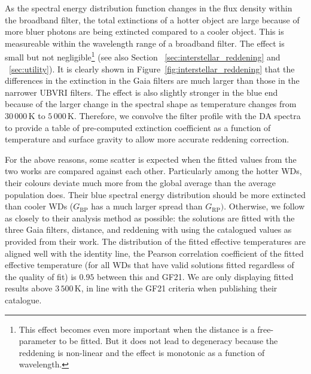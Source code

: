 \documentclass[fleqn,usenatbib]{rasti}
\begin{document}
As the spectral energy distribution function changes in the flux density
within the broadband filter, the total extinctions of a hotter object are
large because of more bluer photons are being extincted compared to a cooler
object. This is measureable within the wavelength range of a broadband filter.
The effect is small but not negligible\footnote{This effect
becomes even more important when the distance is a free-parameter to be fitted.
But it does not lead to degeneracy because the reddening is non-linear and
the effect is monotonic as a function of wavelength.} (see also Section
\textsection~\ref{sec:interstellar_reddening} and \textsection~\ref{sec:utility}).
It is clearly shown in Figure~\ref{fig:interstellar_reddening} that the
differences in the extinction in the Gaia filters are much larger than
those in the narrower UBVRI filters. The effect is also slightly
stronger in the blue end because of the larger change in the spectral
shape as temperature changes from $30\,000$\,K to $5\,000$\,K. Therefore, we
convolve the filter profile with the DA spectra to provide a table of
pre-computed extinction coefficient as a function of temperature and
surface gravity to allow more accurate reddening correction.

For the above reasons, some scatter is expected when the
fitted values from the two works are compared against each other.
Particularly among the hotter WDs, their colours deviate
much more from the global average than the average population
does. Their blue spectral energy distribution should be more
extincted than cooler WDs ($G_{\mathrm{BP}}$ has a much
larger spread than $G_{\mathrm{RP}})$. Otherwise, we follow as closely
to their analysis method as possible: the solutions are
fitted with the three Gaia filters, distance, and reddening with using the
catalogued values as provided from their work.
The distribution of the fitted effective temperatures are aligned well with
the identity line, the Pearson correlation coefficient of the fitted effective
temperature (for all WDs that have valid solutions fitted
regardless of the quality of fit) is $0.95$ between this and GF21. We are
only displaying fitted results above $3\,500$\,K, in line with the GF21
criteria when publishing their catalogue.
\end{document}
